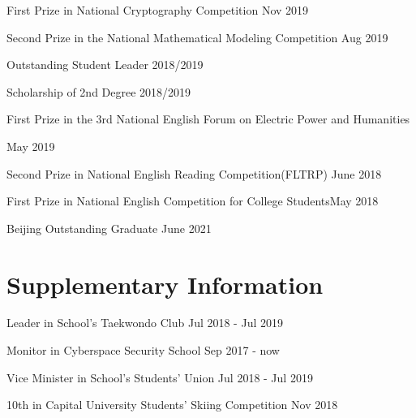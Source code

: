 \documentclass{article}
\begin{document}
\ralewaysb First Prize in National Cryptography Competition \raleway \hfill Nov 2019

\ralewaysb Second Prize in the National Mathematical Modeling Competition \raleway\hfill Aug 2019

\ralewaysb Outstanding Student Leader \raleway\hfill 2018/2019

\ralewaysb Scholarship of 2nd Degree \raleway\hfill 2018/2019

\ralewaysb First Prize in the 3rd National English Forum on Electric Power and Humanities \raleway

 \hfill May 2019

\ralewaysb Second Prize in National English Reading Competition(FLTRP) \raleway \hfill June 2018

\ralewaysb First Prize in National English Competition for College Students\raleway\hfill May 2018

\ralewaysb Beijing Outstanding Graduate \raleway \hfill June 2021

\section{Supplementary Information}
\ralewaysb Leader in School's Taekwondo Club \raleway\hfill Jul 2018 - Jul 2019

\ralewaysb Monitor in Cyberspace Security School  \raleway\hfill Sep 2017 - now

\ralewaysb Vice Minister in School's Students' Union  \raleway\hfill Jul 2018 - Jul 2019

\ralewaysb 10th in Capital University Students' Skiing Competition  \raleway\hfill Nov 2018
\end{document}
